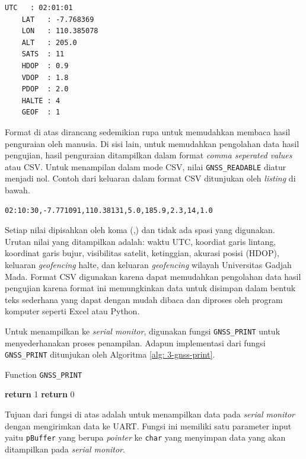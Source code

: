 \vspace{0.3cm}
\begin{lstlisting}[style=mystyle]
	UTC   : 02:01:01
	LAT   : -7.768369
	LON   : 110.385078
	ALT   : 205.0
	SATS  : 11
	HDOP  : 0.9
	VDOP  : 1.8
	PDOP  : 2.0
	HALTE : 4
	GEOF  : 1
\end{lstlisting}

Format di atas dirancang sedemikian rupa untuk memudahkan membaca hasil penguraian oleh manusia. Di sisi lain, untuk memudahkan pengolahan data hasil pengujian, hasil penguraian ditampilkan dalam format \textit{comma seperated values} atau CSV. Untuk menampilan dalam mode CSV, nilai \texttt{GNSS\_READABLE} diatur menjadi nol. Contoh dari keluaran dalam format CSV ditunjukan oleh \textit{listing} di bawah.

\vspace{0.3cm}
\begin{lstlisting}[style=mystyle]
02:10:30,-7.771091,110.38131,5.0,185.9,2.3,14,1.0
\end{lstlisting}

Setiap nilai dipisahkan oleh koma (,) dan tidak ada spasi yang digunakan. Urutan nilai yang ditampilkan adalah: waktu UTC, koordiat garis lintang, koordinat garis bujur, visibilitas satelit, ketinggian, akurasi posisi (HDOP), keluaran \textit{geofencing} halte, dan keluaran \textit{geofencing} wilayah Universitas Gadjah Mada. Format CSV digunakan karena dapat memudahkan pengolahan data hasil pengujian karena format ini memungkinkan data untuk disimpan dalam bentuk teks sederhana yang dapat dengan mudah dibaca dan diproses oleh program komputer seperti Excel atau Python.

Untuk menampilkan ke \textit{serial monitor}, digunakan fungsi \texttt{GNSS\_PRINT} untuk menyederhanakan proses penampilan. Adapun implementasi dari fungsi \texttt{GNSS\_PRINT} ditunjukan oleh Algoritma \ref{alg: 3-gnss-print}.

\begin{algorithm}[H]
	\caption{Function \texttt{GNSS\_PRINT}}
	\label{alg: 3-gnss-print}
	\begin{algorithmic}[1]
				\State \textbf{return} 1
			\EndIf
			\State {}
			\State \textbf{return} 0
		\EndFunction
	\end{algorithmic}
\end{algorithm}

Tujuan dari fungsi di atas adalah untuk menampilkan data pada \textit{serial monitor} dengan mengirimkan data ke UART. Fungsi ini memiliki satu parameter input yaitu \texttt{pBuffer} yang berupa \textit{pointer} ke \texttt{char} yang menyimpan data yang akan ditampilkan pada \textit{serial monitor}.

